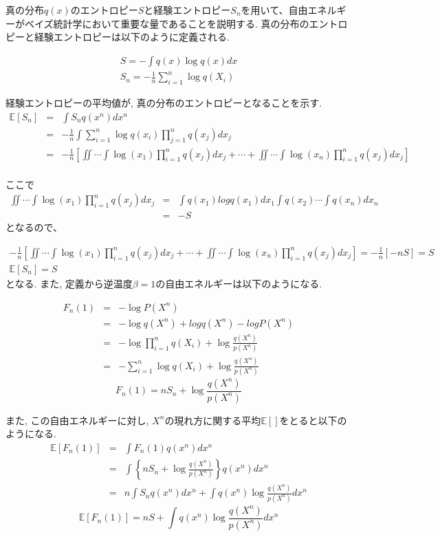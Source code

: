 \documentclass[11pt,a4paper]{jsarticle}
\begin{document}
真の分布$q(x)$のエントロピー$S$と経験エントロピー$S_n$を用いて、自由エネルギーがベイズ統計学において重要な量であることを説明する. 真の分布のエントロピーと経験エントロピーは以下のように定義される.

\begin{align*}
S = - \int q(x) \log q(x) dx \tag{1.15}\\
S_n = - \frac{1}{n} \sum_{i=1}^{n} \log q(X_i) \tag{1.16}
\end{align*}

経験エントロピーの平均値が, 真の分布のエントロピーとなることを示す.
\begin{eqnarray*}
\mathbb{E}[S_n] &=& \int S_n q(x^n) dx^n\\
&=& - \frac{1}{n} \int \sum_{i=1}^{n} \log q(x_i) \prod_{j=1}^{n} q(x_j) dx_j\\
&=& - \frac{1}{n} \left[ \iint \cdots \int \log (x_1) \prod_{i=1}^{n} q(x_j) dx_j + \cdots +  \iint \cdots \int \log (x_n) \prod_{i=1}^{n} q(x_j) dx_j\right]\\
\end{eqnarray*}

ここで
\begin{eqnarray*}
\iint \cdots \int \log (x_1) \prod_{i=1}^{n} q(x_j) dx_j &=& \int q(x_1) log q(x_1) dx_1 \int q(x_2) \cdots \int q(x_n) dx_n\\
&=& -S
\end{eqnarray*}
となるので、

\begin{align*}
- \frac{1}{n} \left[ \iint \cdots \int \log (x_1) \prod_{i=1}^{n} q(x_j) dx_j + \cdots +  \iint \cdots \int \log (x_n) \prod_{i=1}^{n} q(x_j) dx_j\right] = -\frac{1}{n} [-nS] = S\\
\mathbb{E}[S_n] = S \tag{1.17}
\end{align*}
となる. また, 定義から逆温度$\beta = 1$の自由エネルギーは以下のようになる.

\begin{eqnarray*}
F_{n}(1) &=& - \log P(X^n)\\
&=& -\log q(X^n) + log q(X^n) - log P(X^n)\\
&=& -\log \prod_{i=1}^{n} q(X_i) + \log \frac{q(X^n)}{p(X^n)}\\
&=& - \sum_{i=1}^{n} \log q(X_i) + \log \frac{q(X^n)}{p(X^n)}
\end{eqnarray*}
\[ F_{n}(1) = nS_n + \log \frac{q(X^n)}{p(X^n)} \tag{1.18}\]

また, この自由エネルギーに対し, $X^n$の現れ方に関する平均$\mathbb{E[　]}$をとると以下のようになる.
\begin{eqnarray*}
\mathbb{E}[F_{n}(1)] &=& \int F_n(1)q(x^n) dx^n\\
&=& \int \left\{nS_n + \log \frac{q(X^n)}{p(X^n)} \right\} q(x^n) dx^n\\
&=& n \int S_n q(x^n) dx^n + \int q(x^n) \log \frac{q(X^n)}{p(X^n)} dx^n
\end{eqnarray*}
\[\mathbb{E}[F_{n}(1)] = nS + \int q(x^n) \log \frac{q(X^n)}{p(X^n)} dx^n \tag{1.19}\]
\end{document}
